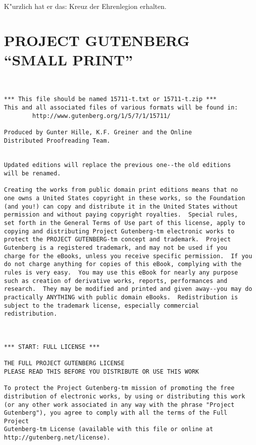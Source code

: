 \documentclass[oneside,12pt]{book}
\newcommand{\s}{s:}%
\begin{document}
K"urzlich hat er da{\s} Kreuz der Ehrenlegion erhalten.



\chapter{PROJECT GUTENBERG ``SMALL PRINT''}
\small {}
\begin{verbatim}


*** This file should be named 15711-t.txt or 15711-t.zip ***
This and all associated files of various formats will be found in:
        http://www.gutenberg.org/1/5/7/1/15711/

Produced by Gunter Hille, K.F. Greiner and the Online
Distributed Proofreading Team.


Updated editions will replace the previous one--the old editions
will be renamed.

Creating the works from public domain print editions means that no
one owns a United States copyright in these works, so the Foundation
(and you!) can copy and distribute it in the United States without
permission and without paying copyright royalties.  Special rules,
set forth in the General Terms of Use part of this license, apply to
copying and distributing Project Gutenberg-tm electronic works to
protect the PROJECT GUTENBERG-tm concept and trademark.  Project
Gutenberg is a registered trademark, and may not be used if you
charge for the eBooks, unless you receive specific permission.  If you
do not charge anything for copies of this eBook, complying with the
rules is very easy.  You may use this eBook for nearly any purpose
such as creation of derivative works, reports, performances and
research.  They may be modified and printed and given away--you may do
practically ANYTHING with public domain eBooks.  Redistribution is
subject to the trademark license, especially commercial
redistribution.



*** START: FULL LICENSE ***

THE FULL PROJECT GUTENBERG LICENSE
PLEASE READ THIS BEFORE YOU DISTRIBUTE OR USE THIS WORK

To protect the Project Gutenberg-tm mission of promoting the free
distribution of electronic works, by using or distributing this work
(or any other work associated in any way with the phrase "Project
Gutenberg"), you agree to comply with all the terms of the Full Project
Gutenberg-tm License (available with this file or online at
http://gutenberg.net/license).



\end{verbatim}
\end{document}
